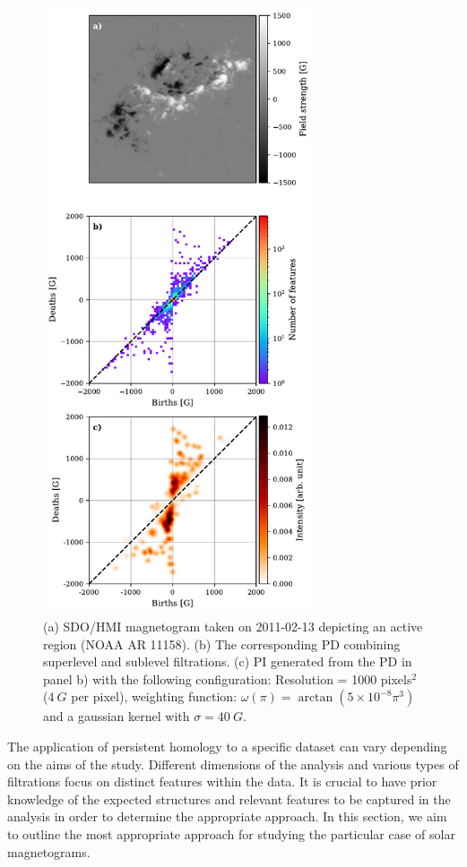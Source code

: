 \documentclass[12pt]{mythesis}
\begin{document}
\begin{figure}
    \centering
     \includegraphics[width=8cm]{Figures/PersistentHomology/PI_PD_example.pdf}
    \caption{(a) SDO/HMI magnetogram taken on 2011-02-13 depicting an active region (NOAA AR 11158). (b) The corresponding PD combining superlevel and sublevel filtrations. (c) PI generated from the PD in panel b) with the following configuration: Resolution =  1000 pixels$^2$ ($4\ G$ per pixel), weighting function: $\omega (\pi) = \arctan (5\times 10 ^{-8} \pi ^{3})$ and a gaussian kernel with $\sigma = 40\ G$.}
   \label{fig: PD+PI_example}
\end{figure}


The application of persistent homology to a specific dataset can vary depending on the aims of the study. Different dimensions of the analysis and various types of filtrations focus on distinct features within the data. It is crucial to have prior knowledge of the expected structures and relevant features to be captured in the analysis in order to determine the appropriate approach. In this section, we aim to outline the most appropriate approach for studying the particular case of solar magnetograms.
\end{document}
